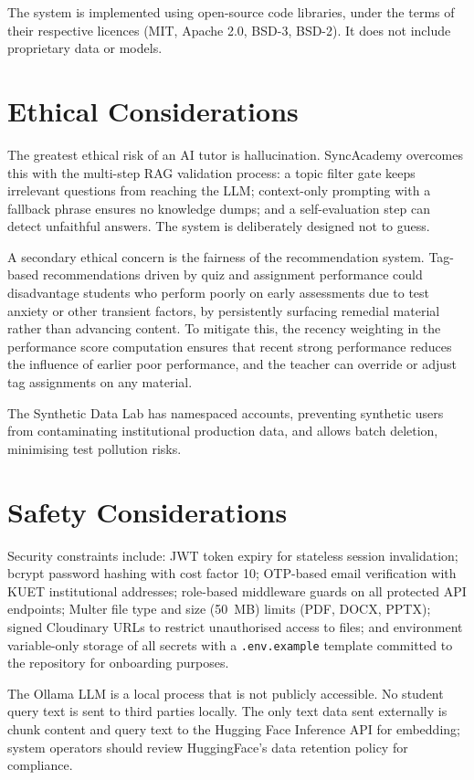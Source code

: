 \documentclass[12pt,a4paper]{report}
\begin{document}
The system is implemented using open-source code libraries, under the terms of their respective licences (MIT, Apache 2.0, BSD-3, BSD-2). It does not include proprietary data or models.

\section{Ethical Considerations}

The greatest ethical risk of an AI tutor is hallucination. SyncAcademy overcomes this with the multi-step RAG validation process: a topic filter gate keeps irrelevant questions from reaching the LLM; context-only prompting with a fallback phrase ensures no knowledge dumps; and a self-evaluation step can detect unfaithful answers. The system is deliberately designed not to guess.

A secondary ethical concern is the fairness of the recommendation system. Tag-based recommendations driven by quiz and assignment performance could disadvantage students who perform poorly on early assessments due to test anxiety or other transient factors, by persistently surfacing remedial material rather than advancing content. To mitigate this, the recency weighting in the performance score computation ensures that recent strong performance reduces the influence of earlier poor performance, and the teacher can override or adjust tag assignments on any material.

The Synthetic Data Lab has namespaced accounts, preventing synthetic users from contaminating institutional production data, and allows batch deletion, minimising test pollution risks.

\section{Safety Considerations}

Security constraints include: JWT token expiry for stateless session invalidation; bcrypt password hashing with cost factor 10; OTP-based email verification with KUET institutional addresses; role-based middleware guards on all protected API endpoints; Multer file type and size (50~MB) limits (PDF, DOCX, PPTX); signed Cloudinary URLs to restrict unauthorised access to files; and environment variable-only storage of all secrets with a \texttt{.env.example} template committed to the repository for onboarding purposes.

The Ollama LLM is a local process that is not publicly accessible. No student query text is sent to third parties locally. The only text data sent externally is chunk content and query text to the Hugging Face Inference API for embedding; system operators should review HuggingFace's data retention policy for compliance.
\end{document}
